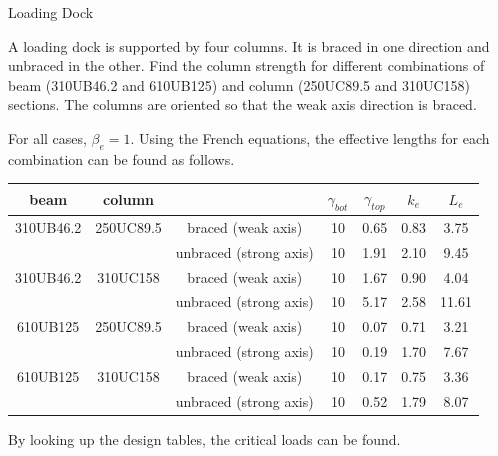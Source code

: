 \begin{exmp}Loading Dock

A loading dock is supported by four columns. It is braced in one direction and unbraced in the other. Find the column strength for different combinations of beam (310UB46.2 and 610UB125) and column (250UC89.5 and 310UC158) sections. The columns are oriented so that the weak axis direction is braced.
\begin{figure}[H]

\end{figure}
\end{exmp}
\begin{solution}
For all cases, $\beta_e=1$. Using the French equations, the effective lengths for each combination can be found as follows.
\begin{table}[H]
\centering\footnotesize
\renewcommand{\arraystretch}{1.2}
\begin{tabular}{ccccccc}
	\toprule
	  beam    &  column   &                        & $\gamma_{bot}$ & $\gamma_{top}$ & $k_e$ & $L_e$ \\ \midrule
	310UB46.2 & 250UC89.5 &   braced (weak axis)   &       10       &      0.65      & 0.83  & 3.75  \\
	          &           & unbraced (strong axis) &       10       &      1.91      & 2.10  & 9.45  \\
	310UB46.2 & 310UC158  &   braced (weak axis)   &       10       &      1.67      & 0.90  & 4.04  \\
	          &           & unbraced (strong axis) &       10       &      5.17      & 2.58  & 11.61 \\
	610UB125  & 250UC89.5 &   braced (weak axis)   &       10       &      0.07      & 0.71  & 3.21  \\
	          &           & unbraced (strong axis) &       10       &      0.19      & 1.70  & 7.67  \\
	610UB125  & 310UC158  &   braced (weak axis)   &       10       &      0.17      & 0.75  & 3.36  \\
	          &           & unbraced (strong axis) &       10       &      0.52      & 1.79  & 8.07  \\ \bottomrule
\end{tabular}
\end{table}
By looking up the design tables, the critical loads can be found.
\begin{table}[H]
\centering\footnotesize
\renewcommand{\arraystretch}{1.2}
\begin{tabular}{ccccccc}

\end{tabular}
\end{table}
\end{solution}
